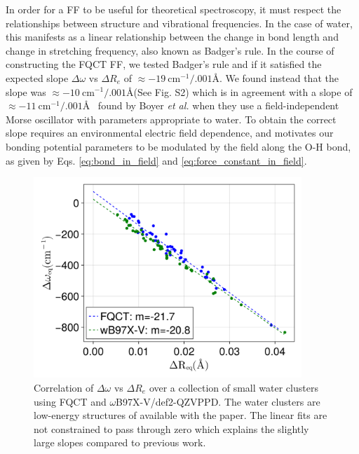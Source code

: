 \documentclass[journal=jctcce,manuscript=article]{achemso}
\begin{document}
In order for a FF to be useful for theoretical spectroscopy, it must respect the relationships between structure and vibrational frequencies. In the case of water, this manifests as a linear relationship between the change in bond length and change in  stretching frequency\cite{boyer2019beyond}, also known as Badger's rule.\cite{badger1934relation} In the course of constructing the FQCT FF, we tested Badger's rule and if it satisfied the expected slope $\Delta\omega$ vs $\Delta R_e$ of $\approx -19\ \mathrm{cm^{-1}/.001}$\AA\cite{boyer2019beyond}. We found instead that the slope was $\approx -10\ \mathrm{cm^{-1}/.001}$\AA (See Fig. S2) which is in agreement with a slope of $\approx -11\ \mathrm{cm^{-1}/.001}$\AA~ found by Boyer \textit{et al.} when they use a field-independent Morse oscillator with parameters appropriate to water. To obtain the correct slope requires an environmental electric field dependence\cite{boyer2019beyond}, and motivates our bonding potential parameters to be modulated by the field along the O-H bond, as given by  Eqs. \ref{eq:bond_in_field} and \ref{eq:force_constant_in_field}. 
\begin{figure}[ht!]
  \includegraphics*[width=0.9\textwidth]{figures/badger_correlation_final.png}
  \caption{Correlation of $\Delta\omega$ vs $\Delta R_e$ over a collection
  of small water clusters using FQCT and $\omega$B97X-V/def2-QZVPPD.
  The water clusters are low-energy structures of  available
  with the paper. The linear fits are not constrained to pass through zero
  which explains the slightly large slopes compared to previous work.\cite{boyer2019beyond}
}
  \label{fig:badger2}
\end{figure}
\end{document}
